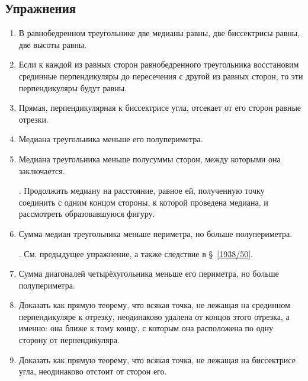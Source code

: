 \documentclass[oneside]{book}
\begin{document}
\subsection*{Упражнения}

\begin{center}
\end{center}

\begin{enumerate}

 \item
В равнобедренном треугольнике две медианы равны, две биссектрисы равны, две высоты равны.

 \item
Если к каждой из равных сторон равнобедренного треугольника восстановим срединные перпендикуляры до пересечения с другой из равных сторон, то эти перпендикуляры будут равны. 

 \item
Прямая, перпендикулярная к биссектрисе угла, отсекает от его сторон равные отрезки.

 \item
Медиана треугольника меньше его полупериметра.

 \item
Медиана треугольника меньше полусуммы сторон, между которыми она заключается.

\smallskip
{}.
Продолжить медиану на расстояние, равное ей, полученную точку соединить с одним концом стороны, к которой проведена медиана, и рассмотреть образовавшуюся фигуру.

 \item
Сумма медиан треугольника меньше периметра, но больше полупериметра.

\smallskip
{}.
См. предыдущее упражнение, а также следствие в §~\ref{1938/50}.

 \item
Сумма диагоналей четырёхугольника меньше его периметра, но больше полупериметра.

 \item
Доказать как прямую теорему, что всякая точка, не лежащая на срединном перпендикуляре к отрезку, неодинаково удалена от концов этого отрезка, а именно: 
она ближе к тому концу, с которым она расположена по одну сторону от перпендикуляра.

 \item
Доказать как прямую теорему, что всякая точка, не лежащая на биссектрисе угла, неодинаково отстоит от сторон его.


\end{enumerate}
\end{document}
